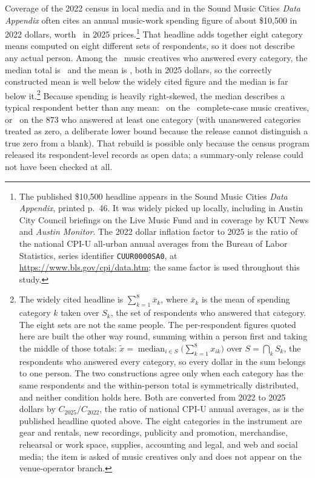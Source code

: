 Coverage of the 2022 census in local media and in the Sound Music Cities
\textit{Data Appendix} often cites an annual music-work spending figure of
about \$10,500 in 2022 dollars, worth \NCensusSpendSumofmeansTwoZeroTwoFive\
in 2025 prices.\footnote{The published \$10,500 headline appears in the Sound
Music Cities \textit{Data Appendix}, printed p.~46. It was widely picked up
locally, including in Austin City Council briefings on the Live Music Fund
and in coverage by KUT News and \textit{Austin Monitor}. The 2022 dollar
inflation factor to 2025 is the ratio of the national CPI-U all-urban annual
averages from the Bureau of Labor Statistics, series identifier
\texttt{CUUR0000SA0}, at \url{https://www.bls.gov/cpi/data.htm}; the same
factor is used throughout this study.} That headline adds together eight
category means computed on eight different sets of respondents, so it does
not describe any actual person. Among the \NCensusSpendCompleteN\ music
creatives who answered every category, the median total is
\NCensusSpendTotalMedian\ and the mean is \NCensusSpendTotalMean, both in
2025 dollars, so the correctly constructed mean is well below the widely
cited figure and the median is far below it.\footnote{The widely cited
headline is \(\sum_{k=1}^{8}\bar{x}_k\), where \(\bar{x}_k\) is the mean of
spending category \(k\) taken over \(S_k\), the set of respondents who
answered that category. The eight sets are not the same people. The
per-respondent figures quoted here are built the other way round, summing
within a person first and taking the middle of those totals:
\(\tilde{x} = \operatorname{median}_{i \in S}
   \bigl(\sum_{k=1}^{8} x_{ik}\bigr)\)
over \(S = \bigcap_k S_k\), the respondents who answered every category, so
every dollar in the sum belongs to one person. The two constructions agree
only when each category has the same respondents and the within-person total
is symmetrically distributed, and neither condition holds here. Both are
converted from 2022 to 2025 dollars by \(C_{2025}/C_{2022}\), the ratio of
national CPI-U annual averages, as is the published headline quoted above.
The eight categories in the instrument are gear and rentals, new recordings,
publicity and promotion, merchandise, rehearsal or work space, supplies,
accounting and legal, and web and social media; the item is asked of music
creatives only and does not appear on the venue-operator branch.} Because spending is
heavily right-skewed, the median describes a typical respondent better than
any mean: \NCensusSpendTotalMedian\
on the \NCensusSpendCompleteN\ complete-case music creatives, or
\NCensusSpendTotalMedianAnyitem\ on the 873 who answered at least one
category (with unanswered categories treated as zero, a deliberate lower
bound because the release cannot distinguish a true zero from a blank). That
rebuild is possible only because the census program released its
respondent-level records as open data; a summary-only release could not have
been checked at all.

